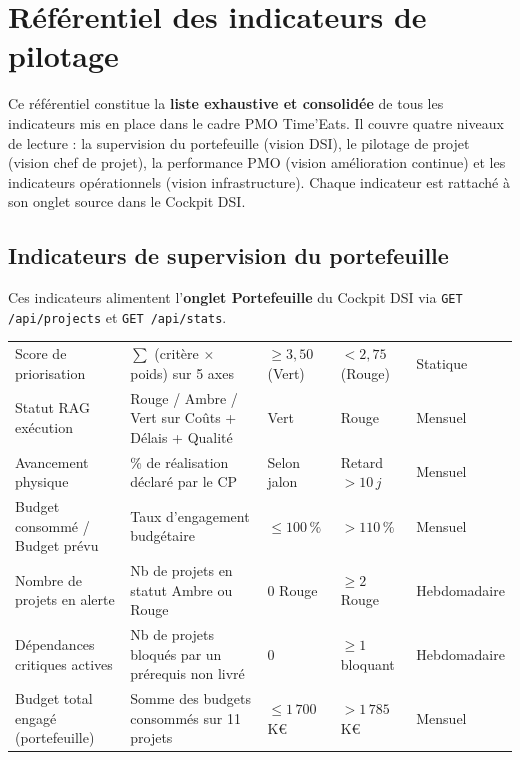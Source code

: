 \documentclass[11pt,a4paper,oneside]{report}
\begin{document}
\section{Référentiel des indicateurs de pilotage}

\begin{finding}
Ce référentiel constitue la \textbf{liste exhaustive et consolidée} de tous les indicateurs mis en place dans le cadre PMO Time'Eats. Il couvre quatre niveaux de lecture : la supervision du portefeuille (vision DSI), le pilotage de projet (vision chef de projet), la performance PMO (vision amélioration continue) et les indicateurs opérationnels (vision infrastructure). Chaque indicateur est rattaché à son onglet source dans le Cockpit DSI.
\end{finding}

\subsection{Indicateurs de supervision du portefeuille}

Ces indicateurs alimentent l'\textbf{onglet Portefeuille} du Cockpit DSI via \texttt{GET /api/projects} et \texttt{GET /api/stats}.

\vspace{4pt}
\begin{center}
\renewcommand{\arraystretch}{1.5}
\begin{tabularx}{\textwidth}{L{4.5cm} L{3.5cm} C{2cm} C{2cm} L{2cm}}
\toprule
{}
 &  &  &  &  \\
\midrule
Score de priorisation & $\sum$ (critère $\times$ poids) sur 5 axes & $\geq 3{,}50$ (Vert) & $< 2{,}75$ (Rouge) & Statique \\
Statut RAG exécution & Rouge / Ambre / Vert sur Coûts + Délais + Qualité & Vert & Rouge & Mensuel \\
Avancement physique & \% de réalisation déclaré par le CP & Selon jalon & Retard $>10\,j$ & Mensuel \\
Budget consommé / Budget prévu & Taux d'engagement budgétaire & $\leq 100\,\%$ & $> 110\,\%$ & Mensuel \\
Nombre de projets en alerte & Nb de projets en statut Ambre ou Rouge & 0 Rouge & $\geq 2$ Rouge & Hebdomadaire \\
Dépendances critiques actives & Nb de projets bloqués par un prérequis non livré & 0 & $\geq 1$ bloquant & Hebdomadaire \\
Budget total engagé (portefeuille) & Somme des budgets consommés sur 11 projets & $\leq 1\,700$\,K€ & $>1\,785$\,K€ & Mensuel \\
\bottomrule
\end{tabularx}
\end{center}
\end{document}

